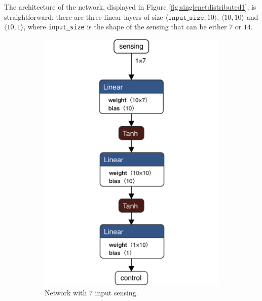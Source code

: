 The architecture of the network, displayed in Figure 
\ref{fig:singlenetdistributed1}, is straightforward: there are three linear layers of 
size $\langle\mathtt{input\_size}, 10\rangle$,  $\langle 10, 
10\rangle$ and $\langle 10, 1\rangle$, where \texttt{input\_size} is the 
shape of the sensing that can be either $7$ or $14$.
\begin{figure}[htb]
	\centering
	\begin{subfigure}[h]{0.495\textwidth}
		\centering
		\includegraphics[width=.8\textwidth]{contents/images/task1distributed@4x}%
		\caption{Network with $7$ input sensing.}
		\label{fig:singlenet-d7distributed1}
	\end{subfigure}
	\hfill
	\begin{subfigure}[h]{0.495\textwidth}
		\centering

\end{subfigure}
\end{figure}
